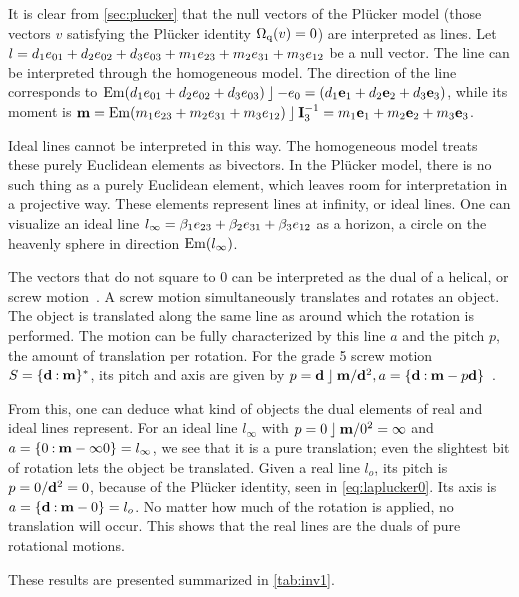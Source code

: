 It is clear from \autoref{sec:plucker} that the null vectors of the Pl\"ucker model (those vectors $v$ satisfying the Pl\"ucker identity $\operatorname{\Omega_q}(v) = 0$) are interpreted as lines.  Let $l = d_1 e_{01} + d_2 e_{02} + d_3 e_{03} + m_1 e_{23} + m_2 e_{31} + m_3 e_{12}$ be a null vector.  The line can be interpreted through the homogeneous model.  The direction of the line corresponds to $\operatorname{Em}(d_1 e_{01} + d_2 e_{02} + d_3 e_{03}) \mathbin{\rfloor} -e_0 = (d_1 \mathbf{e}_1 + d_2 \mathbf{e}_2 + d_3 \mathbf{e}_3)$, while its moment is $\mathbf{m} = \operatorname{Em}(m_1 e_{23} + m_2 e_{31} + m_3 e_{12}) \mathbin{\rfloor} \mathbf{I}_3^{-1} = m_1 \mathbf{e}_1 + m_2 \mathbf{e}_2 + m_3 \mathbf{e}_3$.

Ideal lines cannot be interpreted in this way.  The homogeneous model treats these purely Euclidean elements as bivectors.  In the Pl\"ucker model, there is no such thing as a purely Euclidean element, which leaves room for interpretation in a projective way.  These elements represent lines at infinity, or ideal lines.  One can visualize an ideal line $l_\infty = \beta_1 e_{23} + \beta_2 e_{31} + \beta_3 e_{12}$ as a horizon, a circle on the heavenly sphere in direction $\operatorname{Em}(l_\infty)$.  

The vectors that do not square to $0$ can be interpreted as the dual of a helical, or screw motion~\cite[Section 3.1.2]{Pottmann}.  A screw motion simultaneously translates and rotates an object.  The object is translated along the same line as around which the rotation is performed.  The motion can be fully characterized by this line $a$ and the pitch $p$, the amount of translation per rotation.  For the grade 5 screw motion $S = \{\mathbf{d} \mathbin{:} \mathbf{m}\}^\ast$, its pitch and axis are given by $p = \mathbf{d} \mathbin{\rfloor} \mathbf{m} / \mathbf{d}^2, a = \{\mathbf{d} \mathbin{:} \mathbf{m} - p \mathbf{d}\}$~\cite[Theorem 3.1.9]{Pottmann}.  

From this, one can deduce what kind of objects the dual elements of real and ideal lines represent.  For an ideal line $l_\infty$ with $p = 0 \mathbin{\rfloor} \mathbf{m} / 0^2 = \infty$ and $a = \{0 \mathbin{:} \mathbf{m} - \infty 0\} = l_\infty$, we see that it is a pure translation; even the slightest bit of rotation lets the object be translated.  Given a real line $l_o$, its pitch is $p = 0 / \mathbf{d}^2 = 0$, because of the Pl\"ucker identity, seen in \autoref{eq:laplucker0}.  Its axis is $a = \{\mathbf{d} \mathbin{:} \mathbf{m} - 0\} = l_o$.  No matter how much of the rotation is applied, no translation will occur.  This shows that the real lines are the duals of pure rotational motions.

These results are presented summarized in \autoref{tab:inv1}. 


